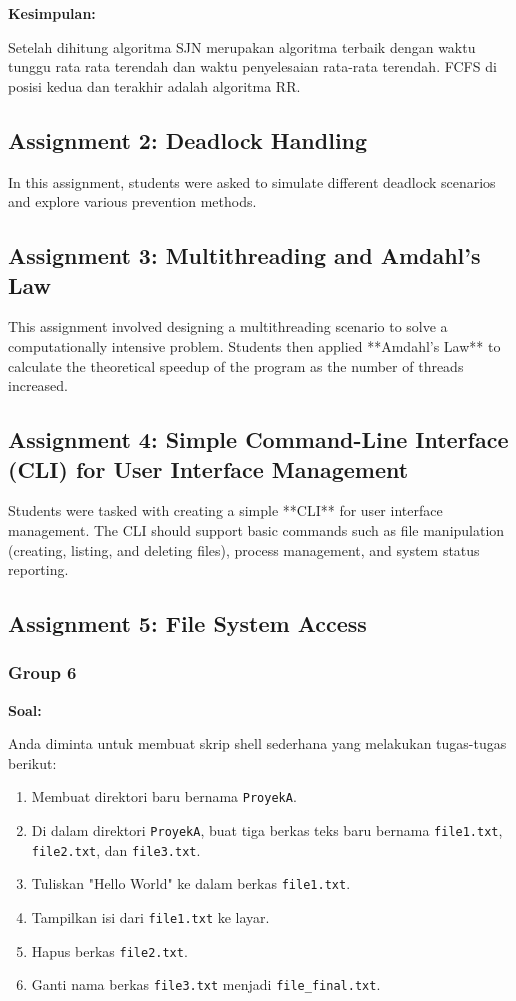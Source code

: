 \documentclass[12pt]{article}
\begin{document}
\textbf{Kesimpulan:}

Setelah dihitung algoritma SJN merupakan algoritma terbaik dengan waktu tunggu rata rata terendah dan waktu penyelesaian rata-rata terendah. FCFS di posisi kedua dan terakhir adalah algoritma RR.

\subsection{Assignment 2: Deadlock Handling}
In this assignment, students were asked to simulate different deadlock scenarios and explore various prevention methods.

\subsection{Assignment 3: Multithreading and Amdahl's Law}
This assignment involved designing a multithreading scenario to solve a computationally intensive problem. Students then applied **Amdahl's Law** to calculate the theoretical speedup of the program as the number of threads increased.

\subsection{Assignment 4: Simple Command-Line Interface (CLI) for User Interface Management}
Students were tasked with creating a simple **CLI** for user interface management. The CLI should support basic commands such as file manipulation (creating, listing, and deleting files), process management, and system status reporting.

\subsection{Assignment 5: File System Access}
\subsubsection{Group 6}
\textbf{Soal:}

Anda diminta untuk membuat skrip shell sederhana yang melakukan tugas-tugas berikut:

\begin{enumerate}
    \item Membuat direktori baru bernama \texttt{ProyekA}.
    \item Di dalam direktori \texttt{ProyekA}, buat tiga berkas teks baru bernama \texttt{file1.txt}, \texttt{file2.txt}, dan \texttt{file3.txt}.
    \item Tuliskan "Hello World" ke dalam berkas \texttt{file1.txt}.
    \item Tampilkan isi dari \texttt{file1.txt} ke layar.
    \item Hapus berkas \texttt{file2.txt}.
    \item Ganti nama berkas \texttt{file3.txt} menjadi \texttt{file\_final.txt}.
\end{enumerate}
\end{document}
